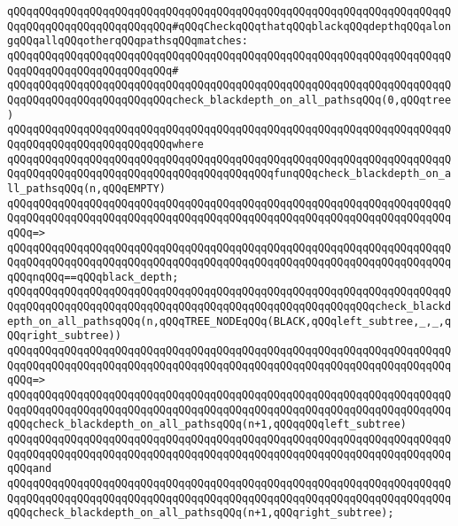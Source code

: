 \newline
\verb|qQQqqQQqqQQqqQQqqQQqqQQqqQQqqQQqqQQqqQQqqQQqqQQqqQQqqQQqqQQqqQQqqQQqqQQqqQQqqQQqqQQqqQQqqQQqqQQq#qQQqCheckqQQqthatqQQqblackqQQqdepthqQQqalongqQQqallqQQqotherqQQqpathsqQQqmatches:|\newline
\verb|qQQqqQQqqQQqqQQqqQQqqQQqqQQqqQQqqQQqqQQqqQQqqQQqqQQqqQQqqQQqqQQqqQQqqQQqqQQqqQQqqQQqqQQqqQQqqQQq#|\newline
\verb|qQQqqQQqqQQqqQQqqQQqqQQqqQQqqQQqqQQqqQQqqQQqqQQqqQQqqQQqqQQqqQQqqQQqqQQqqQQqqQQqqQQqqQQqqQQqqQQqcheck_blackdepth_on_all_pathsqQQq(0,qQQqtree)|\newline
\verb|qQQqqQQqqQQqqQQqqQQqqQQqqQQqqQQqqQQqqQQqqQQqqQQqqQQqqQQqqQQqqQQqqQQqqQQqqQQqqQQqqQQqqQQqqQQqqQQqwhere|\newline
\newline
\verb|qQQqqQQqqQQqqQQqqQQqqQQqqQQqqQQqqQQqqQQqqQQqqQQqqQQqqQQqqQQqqQQqqQQqqQQqqQQqqQQqqQQqqQQqqQQqqQQqqQQqqQQqqQQqqQQqfunqQQqcheck_blackdepth_on_all_pathsqQQq(n,qQQqEMPTY)|\newline
\verb|qQQqqQQqqQQqqQQqqQQqqQQqqQQqqQQqqQQqqQQqqQQqqQQqqQQqqQQqqQQqqQQqqQQqqQQqqQQqqQQqqQQqqQQqqQQqqQQqqQQqqQQqqQQqqQQqqQQqqQQqqQQqqQQqqQQqqQQqqQQqqQQq=>|\newline
\verb|qQQqqQQqqQQqqQQqqQQqqQQqqQQqqQQqqQQqqQQqqQQqqQQqqQQqqQQqqQQqqQQqqQQqqQQqqQQqqQQqqQQqqQQqqQQqqQQqqQQqqQQqqQQqqQQqqQQqqQQqqQQqqQQqqQQqqQQqqQQqqQQqnqQQq==qQQqblack_depth;|\newline
\newline
\verb|qQQqqQQqqQQqqQQqqQQqqQQqqQQqqQQqqQQqqQQqqQQqqQQqqQQqqQQqqQQqqQQqqQQqqQQqqQQqqQQqqQQqqQQqqQQqqQQqqQQqqQQqqQQqqQQqqQQqqQQqqQQqqQQqcheck_blackdepth_on_all_pathsqQQq(n,qQQqTREE_NODEqQQq(BLACK,qQQqleft_subtree,_,_,qQQqright_subtree))|\newline
\verb|qQQqqQQqqQQqqQQqqQQqqQQqqQQqqQQqqQQqqQQqqQQqqQQqqQQqqQQqqQQqqQQqqQQqqQQqqQQqqQQqqQQqqQQqqQQqqQQqqQQqqQQqqQQqqQQqqQQqqQQqqQQqqQQqqQQqqQQqqQQqqQQq=>|\newline
\verb|qQQqqQQqqQQqqQQqqQQqqQQqqQQqqQQqqQQqqQQqqQQqqQQqqQQqqQQqqQQqqQQqqQQqqQQqqQQqqQQqqQQqqQQqqQQqqQQqqQQqqQQqqQQqqQQqqQQqqQQqqQQqqQQqqQQqqQQqqQQqqQQqcheck_blackdepth_on_all_pathsqQQq(n+1,qQQqqQQqleft_subtree)|\newline
\verb|qQQqqQQqqQQqqQQqqQQqqQQqqQQqqQQqqQQqqQQqqQQqqQQqqQQqqQQqqQQqqQQqqQQqqQQqqQQqqQQqqQQqqQQqqQQqqQQqqQQqqQQqqQQqqQQqqQQqqQQqqQQqqQQqqQQqqQQqqQQqqQQqand|\newline
\verb|qQQqqQQqqQQqqQQqqQQqqQQqqQQqqQQqqQQqqQQqqQQqqQQqqQQqqQQqqQQqqQQqqQQqqQQqqQQqqQQqqQQqqQQqqQQqqQQqqQQqqQQqqQQqqQQqqQQqqQQqqQQqqQQqqQQqqQQqqQQqqQQqcheck_blackdepth_on_all_pathsqQQq(n+1,qQQqright_subtree);|\newline
